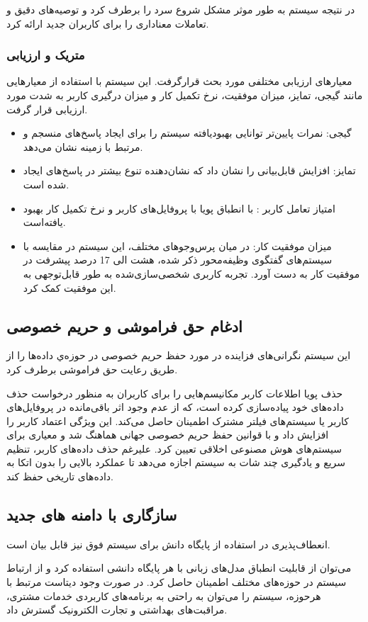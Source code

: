 در نتیجه سیستم به طور موثر مشکل شروع سرد را برطرف کرد و توصیه‌های دقیق و تعاملات معناداری را برای کاربران جدید ارائه کرد.

\subsubsection{متریک و ارزیابی}
 معیارهای ارزیابی مختلفی مورد بحث قرارگرفت. این سیستم با استفاده از معیارهایی مانند گیجی، تمایز، میزان موفقیت، نرخ تکمیل کار و میزان درگیری کاربر به شدت مورد ارزیابی قرار گرفت.
\begin{itemize}
\item
 گیجی: نمرات پایین‌تر توانایی بهبودیافته سیستم را برای ایجاد پاسخ‌های منسجم و مرتبط با زمینه نشان می‌دهد.
\item
 تمایز: افزایش قابل‌بیانی را نشان داد که نشان‌دهنده تنوع بیشتر در پاسخ‌های ایجاد شده است.
\item
 امتیاز تعامل کاربر : با انطباق پویا با پروفایل‌های کاربر و نرخ تکمیل کار بهبود یافته‌است.
\item
 میزان موفقیت کار: در میان پرس‌وجوهای مختلف، این سیستم در مقایسه با سیستم‌های گفتگوی وظیفه‌محور ذکر شده، هشت الی 17 درصد پیشرفت در موفقیت کار به دست آورد. تجربه کاربری شخصی‌سازی‌شده به طور قابل‌توجهی به این موفقیت کمک کرد.
\end{itemize}
\subsection{ادغام حق فراموشی و حریم خصوصی}
این سیستم نگرانی‌های فزاینده در مورد حفظ حریم خصوصی در حوزه‌ي داده‌ها را از طریق رعایت حق فراموشی برطرف کرد.

 حذف پویا اطلاعات کاربر مکانیسم‌هایی را برای کاربران به منظور درخواست حذف داده‌های خود پیاده‌سازی کرده است، که از عدم وجود اثر باقی‌مانده در پروفایل‌های کاربر یا سیستم‌های فیلتر مشترک اطمینان حاصل می‌کند. این ویژگی اعتماد کاربر را افزایش داد و با قوانین حفظ حریم خصوصی جهانی هماهنگ شد و معیاری برای سیستم‌های هوش مصنوعی اخلاقی تعیین کرد. علیرغم حذف داده‌های کاربر، تنظیم سریع و یادگیری چند شات به سیستم اجازه می‌دهد تا عملکرد بالایی را بدون اتکا به داده‌های تاریخی حفظ کند.

\subsection{سازگاری با دامنه های جدید}

 انعطاف‌پذیری در استفاده از پایگاه دانش برای سیستم فوق نیز قابل بیان است.

 می‌توان از قابلیت انطباق مدل‌های زبانی با هر پایگاه دانشی استفاده کرد و از ارتباط سیستم در حوزه‌های مختلف اطمینان حاصل کرد. در صورت وجود دیتاست‌ مرتبط با هرحوزه، سیستم را می‌توان به راحتی به برنامه‌های کاربردی خدمات مشتری، مراقبت‌های بهداشتی و تجارت الکترونیک گسترش داد.

